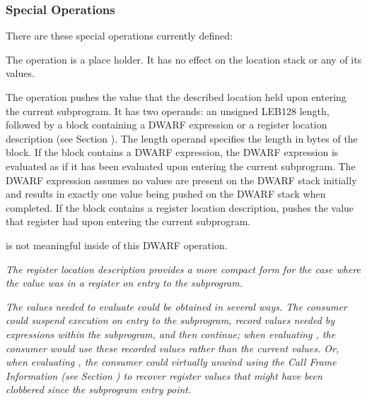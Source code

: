\subsubsection{Special Operations}
\label{chap:specialoperations}
There 
are these special operations currently defined:
\begin{enumerate}[1. ]
\itembfnl{\DWOPnopTARG}
The \DWOPnopNAME{} operation is a place holder. It has no effect
on the location stack or any of its values.

\itembfnl{\DWOPentryvalueTARG}
The \DWOPentryvalueNAME{} operation pushes 
the value that the described location held
upon entering the current subprogram.  It has two operands: an 
unsigned LEB128 length, followed by 
a block containing a DWARF expression or a register location description 
(see Section ).  
The length operand specifies the length in bytes of the block.  
\bb
If the block contains a DWARF expression,
the DWARF expression is evaluated as if it has been evaluated upon entering
the current subprogram.  The DWARF expression 
assumes no values are present on the DWARF stack initially and results
in exactly one value being pushed on the DWARF stack when completed.
If the block contains a register location
description, \DWOPentryvalueNAME{} pushes the value that register had upon
entering the current subprogram. 
\eb

\DWOPpushobjectaddress{} is not meaningful inside of this DWARF operation.

\textit{\bb 
The register location description provides a more compact form for the
case where the value was in a register on entry to the subprogram.
\eb}

\textit{The values needed to evaluate \DWOPentryvalueNAME{} could be obtained in
several ways. The consumer could suspend execution on entry to the
subprogram, record values needed by \DWOPentryvalueNAME{} expressions within
the subprogram, and then continue; when evaluating \DWOPentryvalueNAME{},
the consumer would use these recorded values rather than the current
values.  Or, when evaluating \DWOPentryvalueNAME{}, the consumer could
virtually unwind using the Call Frame Information 
(see Section ) 
to recover register values that might have been clobbered since the
subprogram entry point.}

\end{enumerate}

